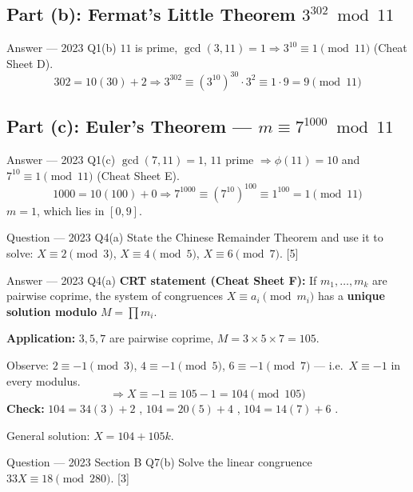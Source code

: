 \documentclass[12pt,a4paper]{article}
\begin{document}
\subsection{Part (b): Fermat's Little Theorem $3^{302} \bmod 11$}
\begin{solbox}{Answer --- 2023 Q1(b)}
$11$ is prime, $\gcd(3,11)=1 \Rightarrow 3^{10}\equiv1\pmod{11}$ (Cheat Sheet D).
\[
302 = 10(30)+2 \Rightarrow 3^{302} \equiv (3^{10})^{30}\cdot3^2 \equiv 1\cdot9 = \boxed{9} \pmod{11}
\]
\end{solbox}

\subsection{Part (c): Euler's Theorem --- $m \equiv 7^{1000} \bmod 11$}
\begin{solbox}{Answer --- 2023 Q1(c)}
$\gcd(7,11)=1$, $11$ prime $\Rightarrow \phi(11)=10$ and $7^{10}\equiv1\pmod{11}$ (Cheat Sheet E).
\[
1000 = 10(100)+0 \Rightarrow 7^{1000} \equiv (7^{10})^{100} \equiv 1^{100} = \boxed{1} \pmod{11}
\]
$m=1$, which lies in $[0,9]$. \checkmark
\end{solbox}

\newpage
\begin{qbox}{Question --- 2023 Q4(a)}
State the Chinese Remainder Theorem and use it to solve: $X\equiv2\pmod3$, $X\equiv4\pmod5$, $X\equiv6\pmod7$. \hfill [5]
\end{qbox}

\begin{solbox}{Answer --- 2023 Q4(a)}
\textbf{CRT statement (Cheat Sheet F):} If $m_1,\dots,m_k$ are pairwise coprime, the system of congruences $X\equiv a_i\pmod{m_i}$ has a \textbf{unique solution modulo} $M=\prod m_i$.

\textbf{Application:} $3,5,7$ are pairwise coprime, $M=3\times5\times7=105$.

Observe: $2\equiv-1\pmod3$, $4\equiv-1\pmod5$, $6\equiv-1\pmod7$ --- i.e.\ $X\equiv-1$ in every modulus.
\[
\Rightarrow X \equiv -1 \equiv 105-1 = \boxed{104} \pmod{105}
\]
\textbf{Check:} $104 = 34(3)+2$ \checkmark, $104=20(5)+4$ \checkmark, $104=14(7)+6$ \checkmark.

General solution: $X = 104 + 105k$.
\end{solbox}

\newpage
\begin{qbox}{Question --- 2023 Section B Q7(b)}
Solve the linear congruence $33X \equiv 18 \pmod{280}$. \hfill [3]
\end{qbox}
\end{document}
